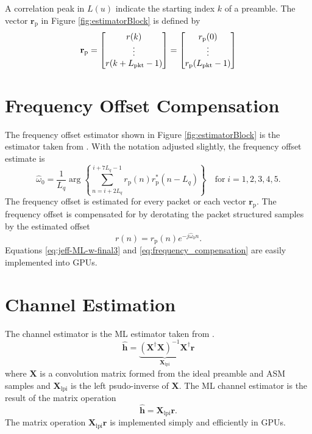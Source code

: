 A correlation peak in $L(u)$ indicate the starting index $k$ of a preamble.
The vector $\mathbf{r}_\text{p}$ in Figure \ref{fig:estimatorBlock} is defined by
\begin{equation}
\mathbf{r}_\text{p} = 
\begin{bmatrix}
r(k) \\ 
\vdots \\ 
r(k+L_\text{pkt}-1)
\end{bmatrix}
=
\begin{bmatrix}
r_\text{p}(0) \\ 
\vdots \\ 
r_\text{p}(L_\text{pkt}-1)
\end{bmatrix}
\end{equation}

\section{Frequency Offset Compensation}
\label{sec:freq_offset_comp}
The frequency offset estimator shown in Figure \ref{fig:estimatorBlock} is the estimator taken from \cite[eq. (24)]{rice2014frequency}.
With the notation adjusted slightly, the frequency offset estimate is
\begin{equation}
	\hat{\omega}_0 = \frac{1}{L_q} \arg\left\{ \sum_{n=i+2L_q}^{i+7L_q-1} r_\text{p}(n)r_\text{p}^\ast(n-L_q)\right\}
	\quad
\text{for} \;
i=1,2,3,4,5.
	\label{eq:jeff-ML-w-final3}
\end{equation}
The frequency offset is estimated for every packet or each vector $\mathbf{r}_\text{p}$.
The frequency offset is compensated for by derotating the packet structured samples by the estimated offset
\begin{equation}
	r(n) = r_\text{p}(n) e^{-j\hat{\omega}_0n}.
	\label{eq:frequency_compensation}
\end{equation}
Equations \eqref{eq:jeff-ML-w-final3} and \eqref{eq:frequency_compensation} are easily implemented into GPUs. 

\section{Channel Estimation}
\label{sec:channel_estimation}
The channel estimator is the ML estimator taken from \cite[eq. 8]{rice-afran-saquib-cole-rhodes-moazzami:2014}.
\begin{equation}
\hat{\mathbf{h}} = \underbrace{ \left( \mathbf{X}^\dag\mathbf{X} \right)^{-1} \mathbf{X}^\dag}_{\mathbf{X}_\text{lpi}}\mathbf{r}
\end{equation}
where $\mathbf{X}$ is a convolution matrix formed from the ideal preamble and ASM samples
and $\mathbf{X}_\text{lpi}$ is the left psudo-inverse of $\mathbf{X}$.
The ML channel estimator is the result of the matrix operation
\begin{equation}
\hat{\mathbf{h}} = \mathbf{X}_\text{lpi} \mathbf{r}.
\end{equation}
The matrix operation $\mathbf{X}_\text{lpi} \mathbf{r}$ is implemented simply and efficiently in GPUs.


